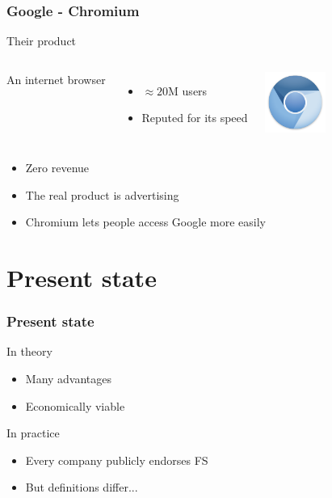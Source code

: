 \documentclass{beamer}
\begin{document}
\begin{frame}

  \frametitle{Google - Chromium}

  \begin{block}{Their product}
    \begin{columns}[c]

      An internet browser
      \begin{itemize}
        \item{$\approx 20$M users}
        \item{Reputed for its speed}
      \end{itemize}

      \includegraphics[width=2cm]{logo_chromium.png}

    \end{columns}
  \end{block}

  \vfill

  \begin{itemize}
    \item<2->{Zero revenue}
    \item<3->{The real product is advertising}
    \item<4>{Chromium lets people access Google more easily}
  \end{itemize}

\end{frame}

\section{Present state}

\begin{frame}

  \frametitle{Present state}

  \begin{block}{In theory}
    \begin{itemize}
      \item{Many advantages}
      \item{Economically viable}
    \end{itemize}
  \end{block}

  \vfill

  \begin{block}{In practice}
    \begin{itemize}
      \item<2->{Every company publicly endorses FS}
      \item<3->{But definitions differ...}
    \end{itemize}
  \end{block}

\end{frame}
\end{document}
